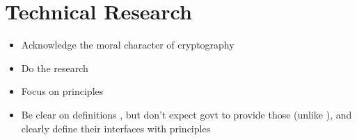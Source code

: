 \section{Technical Research}

\begin{itemize}
    \item Acknowledge the moral character of cryptography \cite{rogaway_moral_2015}
    \item Do the research
    \item Focus on principles \cite{levy_robinson_2018}
    \item Be clear on definitions \cite{varia_2018}, but don't expect govt to provide those (unlike
            \cite{abelson_2015}), and clearly define their interfaces with principles
            \cite{matyas_incommensurability_2018}
\end{itemize}
